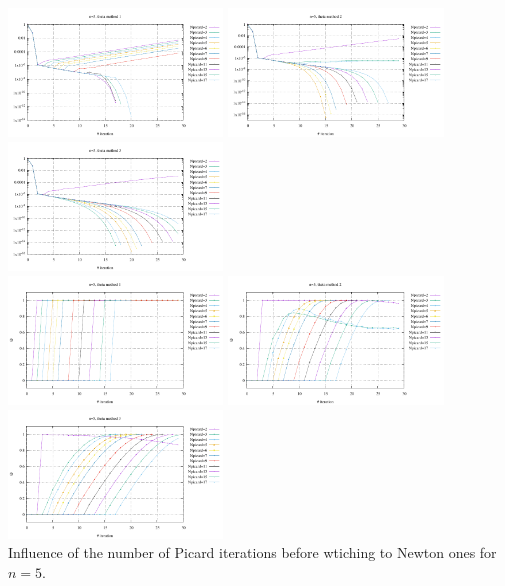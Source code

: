 \begin{center}
\includegraphics[width=5.7cm]{python_codes/fieldstone_87/results/experiment_01/conv_n5_meth1}
\includegraphics[width=5.7cm]{python_codes/fieldstone_87/results/experiment_01/conv_n5_meth2}
\includegraphics[width=5.7cm]{python_codes/fieldstone_87/results/experiment_01/conv_n5_meth3}\\
\includegraphics[width=5.7cm]{python_codes/fieldstone_87/results/experiment_01/theta_n5_meth1}
\includegraphics[width=5.7cm]{python_codes/fieldstone_87/results/experiment_01/theta_n5_meth2}
\includegraphics[width=5.7cm]{python_codes/fieldstone_87/results/experiment_01/theta_n5_meth3}\\
{\captionfont Influence of the number of Picard iterations before wtiching to Newton ones for $n=5$.}
\end{center}


